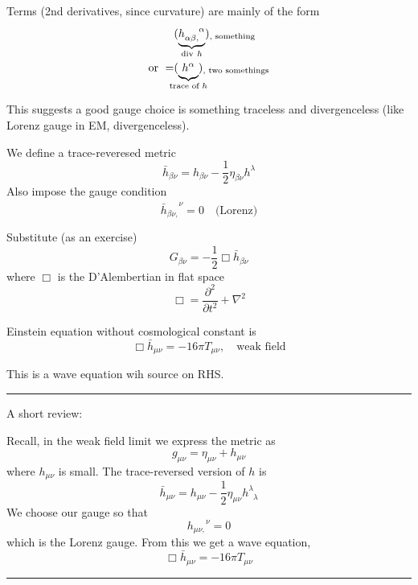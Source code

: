 \documentclass[a4paper]{article} %
\renewcommand{\div}{\text{div}~}
\newcommand{\review}[1]
{
\hrule
A short review:

#1
\hrule
}
\begin{document}
Terms (2nd derivatives, since curvature) are mainly of the form 
\begin{align}
&(\underbrace{h_{\alpha \beta,}^{\phantom{\alpha\beta,}\alpha}}_{\mathclap{\div h}})_{,\text{ something}}\\
\text{or }=& (\underbrace{h^{\alpha}_{\phantom{\alpha}}}_{\mathclap{\text{trace of $h$}}})_{,\text{ two somethings}}
\end{align}

This suggests a good gauge choice is something traceless and divergenceless (like Lorenz gauge in EM, divergenceless).

We define a trace-reveresed metric
\begin{equation}
\bar{h}_{\beta\nu}=h_{\beta\nu}-\frac{1}{2}\eta_{\beta\nu}h^{\lambda}_{\phantom{\lambda}}
\end{equation}
Also impose the gauge condition
\begin{equation}
\bar{h}_{\beta\nu,}^{\phantom{\beta\nu,}\nu}=0\quad\text{(Lorenz)}
\end{equation}

Substitute (as an exercise)
\begin{equation}
G_{\beta\nu}=-\frac{1}{2}\Box \bar{h}_{\beta\nu}
\end{equation}
where $\Box$ is the D'Alembertian in flat space
\begin{equation}
\Box = \frac{\partial^2}{\partial t^2}+\nabla^2
\end{equation}

Einstein equation without cosmological constant is
\begin{equation}
\Box \bar{h}_{\mu\nu}=-16 \pi T_{\mu\nu},\quad\text{weak field}
\end{equation}

This is a wave equation wih source on RHS.

\review{Recall, in the weak field limit we express the metric as
\begin{equation}
g_{\mu\nu}=\eta_{\mu \nu}+h_{\mu \nu}
\end{equation}
where $h_{\mu\nu}$ is small. The trace-reversed version of $h$ is
\begin{equation}
\bar{h}_{\mu\nu}=h_{\mu\nu}-\frac{1}{2}\eta_{\mu\nu}h^{\lambda}_{\phantom{\lambda}\lambda}
\end{equation}
We choose our gauge so that
\begin{equation}
h_{\mu\nu,}^{\phantom{\mu\nu,}\nu}=0
\end{equation}
which is the Lorenz gauge. From this we get a wave equation,
\begin{equation}
\Box \bar{h}_{\mu\nu}=-16\pi T_{\mu\nu}\label{wave eqn}
\end{equation}
}
\end{document}
